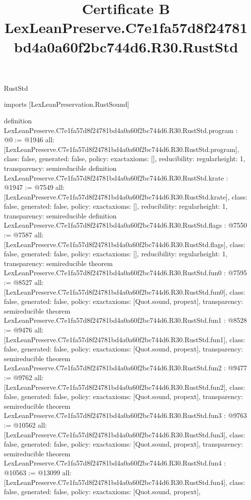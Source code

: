 \begin{lexlean}{RustStd}
\title{Certificate B LexLeanPreserve.C7e1fa57d8f24781bd4a0a60f2bc744d6.R30.RustStd}
\begin{coremodule}
imports [LexLeanPreservation.RustSound]

definition LexLeanPreserve.C7e1fa57d8f24781bd4a0a60f2bc744d6.R30.RustStd.program : @0 := @1946 {
  all: [LexLeanPreserve.C7e1fa57d8f24781bd4a0a60f2bc744d6.R30.RustStd.program],
  class: false,
  generated: false,
  policy: exact{axioms: []},
  reducibility: regular{height: 1},
  transparency: semireducible
}
definition LexLeanPreserve.C7e1fa57d8f24781bd4a0a60f2bc744d6.R30.RustStd.krate : @1947 := @7549 {
  all: [LexLeanPreserve.C7e1fa57d8f24781bd4a0a60f2bc744d6.R30.RustStd.krate],
  class: false,
  generated: false,
  policy: exact{axioms: []},
  reducibility: regular{height: 1},
  transparency: semireducible
}
definition LexLeanPreserve.C7e1fa57d8f24781bd4a0a60f2bc744d6.R30.RustStd.flags : @7550 := @7587 {
  all: [LexLeanPreserve.C7e1fa57d8f24781bd4a0a60f2bc744d6.R30.RustStd.flags],
  class: false,
  generated: false,
  policy: exact{axioms: []},
  reducibility: regular{height: 1},
  transparency: semireducible
}
theorem LexLeanPreserve.C7e1fa57d8f24781bd4a0a60f2bc744d6.R30.RustStd.fun0 : @7595 := @8527 {
  all: [LexLeanPreserve.C7e1fa57d8f24781bd4a0a60f2bc744d6.R30.RustStd.fun0],
  class: false,
  generated: false,
  policy: exact{axioms: [Quot.sound, propext]},
  transparency: semireducible
}
theorem LexLeanPreserve.C7e1fa57d8f24781bd4a0a60f2bc744d6.R30.RustStd.fun1 : @8528 := @9476 {
  all: [LexLeanPreserve.C7e1fa57d8f24781bd4a0a60f2bc744d6.R30.RustStd.fun1],
  class: false,
  generated: false,
  policy: exact{axioms: [Quot.sound, propext]},
  transparency: semireducible
}
theorem LexLeanPreserve.C7e1fa57d8f24781bd4a0a60f2bc744d6.R30.RustStd.fun2 : @9477 := @9762 {
  all: [LexLeanPreserve.C7e1fa57d8f24781bd4a0a60f2bc744d6.R30.RustStd.fun2],
  class: false,
  generated: false,
  policy: exact{axioms: [Quot.sound, propext]},
  transparency: semireducible
}
theorem LexLeanPreserve.C7e1fa57d8f24781bd4a0a60f2bc744d6.R30.RustStd.fun3 : @9763 := @10562 {
  all: [LexLeanPreserve.C7e1fa57d8f24781bd4a0a60f2bc744d6.R30.RustStd.fun3],
  class: false,
  generated: false,
  policy: exact{axioms: [Quot.sound, propext]},
  transparency: semireducible
}
theorem LexLeanPreserve.C7e1fa57d8f24781bd4a0a60f2bc744d6.R30.RustStd.fun4 : @10563 := @13099 {
  all: [LexLeanPreserve.C7e1fa57d8f24781bd4a0a60f2bc744d6.R30.RustStd.fun4],
  class: false,
  generated: false,
  policy: exact{axioms: [Quot.sound, propext]},
}
\end{coremodule}
\end{lexlean}
